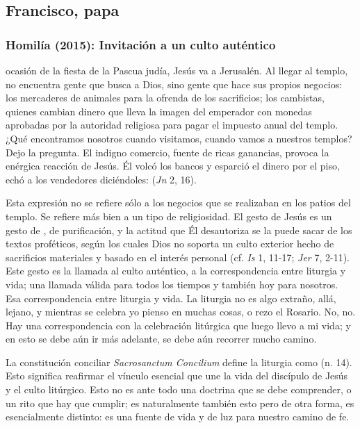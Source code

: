 \newsection
\subsection{Francisco, papa}

\subsubsection{Homilía (2015): Invitación a un culto auténtico}


\begin{body}
 ocasión de la fiesta de la Pascua judía, Jesús va a Jerusalén. Al llegar al templo, no encuentra gente que busca a Dios, sino gente que hace sus propios negocios: los mercaderes de animales para la ofrenda de los sacrificios; los cambistas, quienes cambian dinero  que lleva la imagen del emperador con monedas aprobadas por la autoridad religiosa para pagar el impuesto anual del templo. ¿Qué encontramos nosotros cuando visitamos, cuando vamos a nuestros templos? Dejo la pregunta. El indigno comercio, fuente de ricas ganancias, provoca la enérgica reacción de Jesús. Él volcó los bancos y esparció el dinero por el piso, echó a los vendedores diciéndoles:  (\textit{Jn} 2, 16).

Esta expresión no se refiere sólo a los negocios que se realizaban en los patios del templo. Se refiere más bien a un tipo de religiosidad. El gesto de Jesús es un gesto de , de purificación, y la actitud que Él desautoriza se la puede sacar de los textos proféticos, según los cuales Dios no soporta un culto exterior hecho de sacrificios materiales y basado en el interés personal (cf. \textit{Is} 1, 11-17; \textit{Jer} 7, 2-11). Este gesto es la llamada al culto auténtico, a la correspondencia entre liturgia y vida; una llamada válida para todos los tiempos y también hoy para nosotros. Esa correspondencia entre liturgia y vida. La liturgia no es algo extraño, allá, lejano, y mientras se celebra yo pienso en muchas cosas, o rezo el Rosario. No, no. Hay una correspondencia con la celebración litúrgica que luego llevo a mi vida; y en esto se debe aún ir más adelante, se debe aún recorrer mucho camino.

La constitución conciliar \textit{Sacrosanctum Concilium} define la liturgia como  (n. 14). Esto significa reafirmar el vínculo esencial que une la vida del discípulo de Jesús y el culto litúrgico. Esto no es ante todo una doctrina que se debe comprender, o un rito que hay que cumplir; es naturalmente también esto pero de otra forma, es esencialmente distinto: es una fuente de vida y de luz para nuestro camino de fe.


\end{body}
